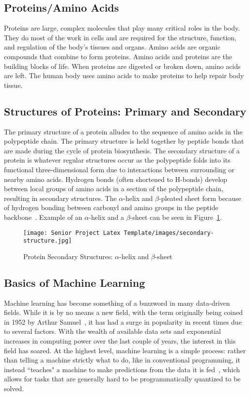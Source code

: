\documentclass[12pt,letterpaper,oneside,reqno]{book}
\theoremstyle{plain}
\theoremstyle{definition}
\theoremstyle{plain}
\theoremstyle{remark}
\theoremstyle{plain}
\theoremstyle{definition}
\theoremstyle{plain}
\begin{document}
\subsection{Proteins/Amino Acids}
Proteins are large, complex molecules that play many critical roles in the body. They do most of the work in cells and are required for the structure, function, and regulation of the body's tissues and organs.
Amino acids are organic compounds that combine to form proteins. Amino acids and proteins are the building blocks of life. When proteins are digested or broken down, amino acids are left. The human body uses amino acids to make proteins to help repair body tissue.
\subsection{Structures of Proteins: Primary and Secondary}
The primary structure of a protein alludes to the sequence of amino acids in the polypeptide chain. The primary structure is held together by peptide bonds that are made during the cycle of protein biosynthesis. The secondary structure of a protein is whatever regular structures occur as the polypeptide folds into its functional three-dimensional form due to interactions between surrounding or nearby amino acids. Hydrogen bonds (often shortened to H-bonds) develop between local groups of amino acids in a section of the polypeptide chain, resulting in secondary structures. The $\alpha$-helix and $\beta$-pleated sheet form because of hydrogen bonding between carbonyl and amino groups in the peptide backbone~\cite{lumenproteins}. Example of an $\alpha$-helix and a $\beta$-sheet can be seen in Figure~\ref{fig:secondarystructs}.
\begin{figure}[H]
    \centering
    \texttt{[image: Senior Project Latex Template/images/secondary-structure.jpg]}
    \caption{Protein Secondary Structures: $\alpha$-helix and $\beta$-sheet}
    \label{fig:secondarystructs}
\end{figure}

\subsection{Basics of Machine Learning}
Machine learning has become something of a buzzword in many data-driven fields. While it is by no means a new field, with the term originally being coined in 1952 by Arthur Samuel~\cite{Foote19}, it has had a surge in popularity in recent times due to several factors. With the wealth of available data sets and exponential increases in computing power over the last couple of years, the interest in this field has soared. At the highest level, machine learning is a simple process: rather than telling a machine strictly what to do, like in conventional programming, it instead ``teaches" a machine to make predictions from the data it is fed~\cite{Heath20}, which allows for tasks that are generally hard to be programmatically quantized to be solved. 
\end{document}
